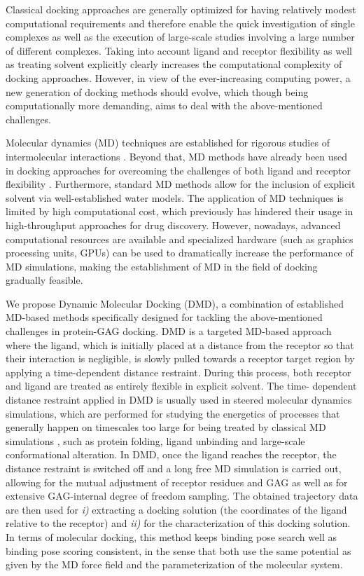Classical docking approaches are generally optimized for having relatively
modest computational requirements and therefore enable the quick investigation
of single complexes as well as the execution of large-scale studies involving a
large number of different complexes. Taking into account ligand and receptor
flexibility as well as treating solvent explicitly clearly increases the
computational complexity of docking approaches. However, in view of the
ever-increasing computing power, a new generation of docking methods should
evolve, which though being computationally more demanding, aims to deal with the
above-mentioned challenges.

Molecular dynamics (MD) techniques are established for rigorous studies of
intermolecular interactions \cite{karplus_molecular_2005}. Beyond that, MD
methods have already been used in docking approaches for overcoming the
challenges of both ligand and receptor flexibility
\cite{chaudhuri_application_2012, antes_dynadock_2010}. Furthermore, standard MD
methods allow for the inclusion of explicit solvent via well-established water
models. The application of MD techniques is limited by high computational cost,
which previously has hindered their usage in high-throughput approaches for drug
discovery. However, nowadays, advanced computational resources are available and
specialized hardware (such as graphics processing units, GPUs) can be used to
dramatically increase the performance of MD simulations, making the
establishment of MD in the field of docking gradually feasible.

We propose Dynamic Molecular Docking (DMD), a combination of established
MD-based methods specifically designed for tackling the above-mentioned
challenges in protein-GAG docking. DMD is a targeted MD-based approach where the
ligand, which is initially placed at a distance from the receptor so that their
interaction is negligible, is slowly pulled towards a receptor target region by
applying a time-dependent distance restraint. During this process, both receptor
and ligand are treated as entirely flexible in explicit solvent. The time-
dependent distance restraint applied in DMD is usually used in steered molecular
dynamics simulations, which are performed for studying the energetics of
processes that generally happen on timescales too large for being treated by
classical MD simulations \cite{xiong_free_2006}, such as protein folding, ligand
unbinding and large-scale conformational alteration. In DMD, once the ligand
reaches the receptor, the distance restraint is switched off and a long free MD
simulation is carried out, allowing for the mutual adjustment of receptor
residues and GAG as well as for extensive GAG-internal degree of freedom
sampling. The obtained trajectory data are then used for \textit{i)} extracting
a docking solution (the coordinates of the ligand relative to the receptor) and
\textit{ii)} for the characterization of this docking solution. In terms of
molecular docking, this method keeps binding pose search well as binding pose
scoring consistent, in the sense that both use the same potential as given by
the MD force field and the parameterization of the molecular system.

